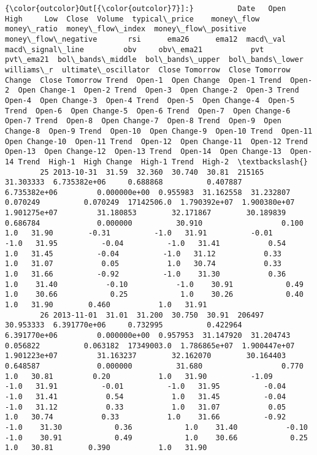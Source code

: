 \documentclass[11pt]{article}
\begin{document}
\begin{Verbatim}[commandchars=\\\{\}]
{\color{outcolor}Out[{\color{outcolor}7}]:}          Date   Open    High     Low  Close  Volume  typical\_price    money\_flow  money\_ratio  money\_flow\_index  money\_flow\_positive  money\_flow\_negative       rsi      ema26      ema12  macd\_val  macd\_signal\_line         obv     obv\_ema21           pvt     pvt\_ema21  bol\_bands\_middle  bol\_bands\_upper  bol\_bands\_lower  williams\_r  ultimate\_oscillator  Close Tomorrow  Close Tomorrow Change  Close Tomorrow Trend  Open-1  Open Change  Open-1 Trend  Open-2  Open Change-1  Open-2 Trend  Open-3  Open Change-2  Open-3 Trend  Open-4  Open Change-3  Open-4 Trend  Open-5  Open Change-4  Open-5 Trend  Open-6  Open Change-5  Open-6 Trend  Open-7  Open Change-6  Open-7 Trend  Open-8  Open Change-7  Open-8 Trend  Open-9  Open Change-8  Open-9 Trend  Open-10  Open Change-9  Open-10 Trend  Open-11  Open Change-10  Open-11 Trend  Open-12  Open Change-11  Open-12 Trend  Open-13  Open Change-12  Open-13 Trend  Open-14  Open Change-13  Open-14 Trend  High-1  High Change  High-1 Trend  High-2  \textbackslash{}
        25 2013-10-31  31.59  32.360  30.740  30.81  215165      31.303333  6.735382e+06     0.688868          0.407887         6.735382e+06         0.000000e+00  0.955983  31.162558  31.232807  0.070249          0.070249  17142506.0  1.790392e+07  1.900380e+07  1.901275e+07         31.180853        32.171867        30.189839    0.686784             0.000000          30.910                  0.100                   1.0   31.90        -0.31          -1.0   31.91          -0.01          -1.0   31.95          -0.04          -1.0   31.41           0.54           1.0   31.45          -0.04          -1.0   31.12           0.33           1.0   31.07           0.05           1.0   30.74           0.33           1.0   31.66          -0.92          -1.0    31.30           0.36            1.0    31.40           -0.10           -1.0    30.91            0.49            1.0    30.66            0.25            1.0    30.26            0.40            1.0   31.90        0.460           1.0   31.91   
        26 2013-11-01  31.01  31.200  30.750  30.91  206497      30.953333  6.391770e+06     0.732995          0.422964         6.391770e+06         0.000000e+00  0.957953  31.147920  31.204743  0.056822          0.063182  17349003.0  1.786865e+07  1.900447e+07  1.901223e+07         31.163237        32.162070        30.164403    0.648587             0.000000          31.680                  0.770                   1.0   30.81         0.20           1.0   31.90          -1.09          -1.0   31.91          -0.01          -1.0   31.95          -0.04          -1.0   31.41           0.54           1.0   31.45          -0.04          -1.0   31.12           0.33           1.0   31.07           0.05           1.0   30.74           0.33           1.0    31.66          -0.92           -1.0    31.30            0.36            1.0    31.40           -0.10           -1.0    30.91            0.49            1.0    30.66            0.25            1.0   30.81        0.390           1.0   31.90   

\end{Verbatim}
\end{document}
